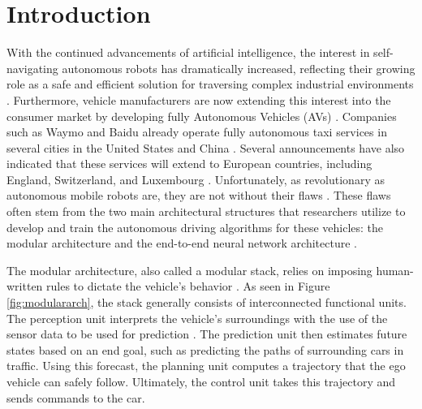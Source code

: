 \chapter{Introduction}
\label{chapter:Introduction}

With the continued advancements of artificial intelligence, the interest in self-navigating autonomous robots has dramatically increased, reflecting their growing role as a safe and efficient solution for traversing complex industrial environments \cite{keith_review_2024, zghair_one_2021, loganathan_systematic_2023}.
Furthermore, vehicle manufacturers are now extending this interest into the consumer market by developing fully Autonomous Vehicles (AVs) \cite{hu_review_2026}.
Companies such as Waymo and Baidu already operate fully autonomous taxi services in several cities in the United States and China \cite{hu_review_2026, jain_Autonomy_20_2021}.
Several announcements have also indicated that these services will extend to European countries, including England, Switzerland, and Luxembourg \cite{saether_recommendations_2026}.
Unfortunately, as revolutionary as autonomous mobile robots are, they are not without their flaws \cite{jain_Autonomy_20_2021, hu_review_2026}.
These flaws often stem from the two main architectural structures that researchers utilize to develop and train the autonomous driving algorithms for these vehicles: the modular architecture and the end-to-end neural network architecture \cite{jain_Autonomy_20_2021,jahncke_MINDStackModularInterpretable_2025, huang_DifferentiableIntegratedMotion_2024, karkus_DiffStackDifferentiableModular_2022}.

The modular architecture, also called a modular stack, relies on imposing human-written rules to dictate the vehicle's behavior \cite{hu_review_2026, jain_Autonomy_20_2021, jahncke_MINDStackModularInterpretable_2025, tampuu_SurveyEndtoEndDriving_2022, wang_VersatileEfficientReinforcement_2022}.
As seen in Figure \ref{fig:modulararch}, the stack generally consists of interconnected functional units.
The perception unit interprets the vehicle's surroundings with the use of the sensor data to be used for prediction \cite{ogretmen_local_2025, hu_review_2026}.
The prediction unit then estimates future states based on an end goal, such as predicting the paths of surrounding cars in traffic.
Using this forecast, the planning unit computes a trajectory that the ego vehicle can safely follow.
Ultimately, the control unit takes this trajectory and sends commands to the car.

